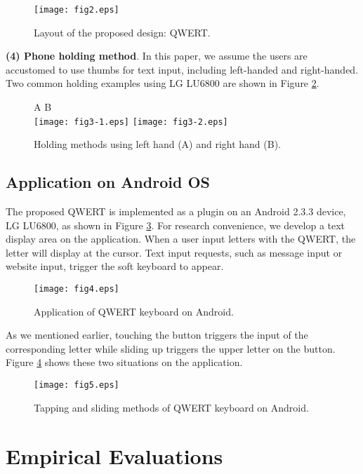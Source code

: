 \documentclass{singlecol-new}
\theoremstyle{TH}{
\newtheorem{lemma}{Lemma}
\newtheorem{theorem}[lemma]{Theorem}
\newtheorem{corrolary}[lemma]{Corrolary}
\newtheorem{conjecture}[lemma]{Conjecture}
\newtheorem{proposition}[lemma]{Proposition}
\newtheorem{claim}[lemma]{Claim}
\newtheorem{stheorem}[lemma]{Wrong Theorem}
\newtheorem{algorithm}{Algorithm}
}
\theoremstyle{THrm}{
\newtheorem{definition}{Definition}[section]
\newtheorem{question}{Question}[section]
\newtheorem{remark}{Remark}
\newtheorem{scheme}{Scheme}
}
\theoremstyle{THhit}{
\newtheorem{case}{Case}[section]
}
\begin{document}
\begin{figure}
  \centering
  \caption{Layout of the proposed design: QWERT.}\label{fig.layout}
  \texttt{[image: fig2.eps]}
\end{figure}

\textbf{(4) Phone holding method}.
In this paper, we assume the users are accustomed to use thumbs for text input, including left-handed and right-handed. Two common holding examples using LG LU6800 are shown in Figure \ref{fig.holding}. \\

\begin{figure}[htbp]
  \centering
  \caption{Holding methods using left hand (A) and right hand (B).}\label{fig.holding}
  {A B}\\
  \texttt{[image: fig3-1.eps]}
  \texttt{[image: fig3-2.eps]}
\end{figure}
\subsection{Application on Android OS}

The proposed QWERT is implemented as a plugin on an Android 2.3.3 device, LG LU6800, as shown in Figure \ref{fig.andr}. For research convenience, we develop a text display area on the application. When a user input letters with the QWERT, the letter will display at the cursor. Text input requests, such as message input or website input, trigger the soft keyboard to appear. \\

\begin{figure}
  \centering
  \caption{Application of QWERT keyboard on Android.}\label{fig.andr}
  \texttt{[image: fig4.eps]}
\end{figure}

As we mentioned earlier, touching the button triggers the input of the corresponding letter while sliding up triggers the upper letter on the button. Figure \ref{fig.show} shows these two situations on the application. \\

\begin{figure}
  \centering
  \caption{Tapping and sliding methods of QWERT keyboard on Android.}\label{fig.show}
  \texttt{[image: fig5.eps]}
\end{figure}

\section{Empirical Evaluations}
\end{document}
